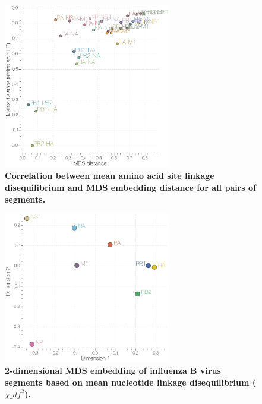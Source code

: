 \documentclass[11pt,oneside,letterpaper]{article}
\begin{document}
\begin{figure}
\centering  
\includegraphics[width=0.65\textwidth]  {supp_figures/InfB_aaLD_MatrixMDScorr.png}
\caption{\textbf{Correlation between mean amino acid site linkage disequilibrium and MDS embedding distance for all pairs of segments.}}
\label{MDSaaCorr}
\end{figure}

\begin{figure}
\centering  
\includegraphics[width=0.65\textwidth]  {supp_figures/InfB_8x8_ntLD_MDS.png}
\caption{\textbf{2-dimensional MDS embedding of influenza B virus segments based on mean nucleotide linkage disequilibrium ($\chi\_{df}^{2}$).}}
\label{MDSntLD}
\end{figure}
\end{document}
